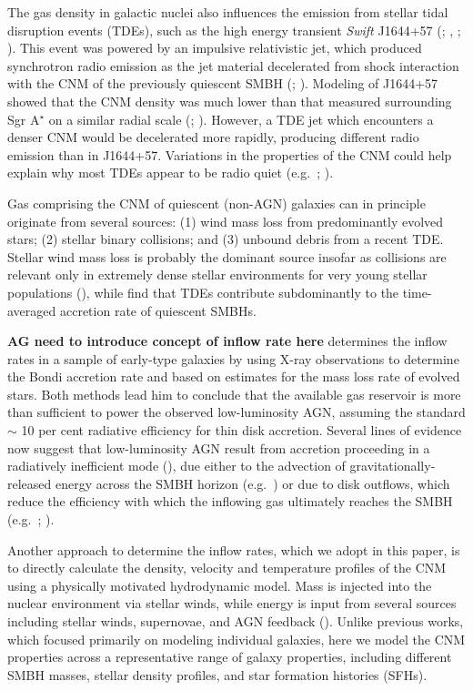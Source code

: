 \documentclass[usenatbib,fleqn]{mn2e}
\begin{document}
The gas density in galactic nuclei also influences the emission from
stellar tidal disruption events (TDEs), such as the high energy
transient {\it Swift} J1644+57 (\citealt{Levan+11};
\citealt{Bloom+11}, \citealt{Burrows+11}; \citealt{Zauderer+11}).
This event was powered by an impulsive relativistic jet, which
produced synchrotron radio emission as the jet material decelerated
from shock interaction with the CNM of the previously quiescent SMBH
(\citealt{Giannios&Metzger11}; \citealt{Zauderer+11}).  Modeling of J1644+57 showed that the CNM density was much lower than
that measured surrounding Sgr A$^{\star}$ on a similar radial scale
(\citealt{Metzger+12}; \citealt{BergerZauderer+:2012a}).  However, a
TDE jet which encounters a denser CNM would be decelerated more rapidly,
producing different radio emission than in J1644+57.
Variations in the properties of the CNM could help explain why most
TDEs appear to be radio quiet (e.g.~\citealt{Bower+13};
\citealt{VanVelzen+13}).

Gas comprising the CNM of quiescent (non-AGN) galaxies can in
principle originate from several sources: (1) wind mass loss from
predominantly evolved stars; (2) stellar binary collisions; and (3)
unbound debris from a recent TDE.  Stellar wind mass loss is probably
the dominant source insofar as collisions are relevant only in
extremely dense stellar environments for very young stellar
populations (\citealt{Rubin&Loeb11}), while \citet{MacLeod+13} find
that TDEs contribute subdominantly to the time-averaged accretion rate
of quiescent SMBHs.

{\bf AG need to introduce concept of inflow rate here}
\citet{Ho:2009a} determines the inflow rates in a sample of early-type
galaxies by using X-ray observations to determine the Bondi accretion
rate and based on estimates for the mass loss rate of evolved stars.
Both methods lead him to conclude that the available gas reservoir is
more than sufficient to power the observed low-luminosity AGN,
assuming the standard $\sim$ 10 per cent radiative efficiency for thin
disk accretion.  Several lines of evidence now suggest that
low-luminosity AGN result from accretion proceeding in a radiatively
inefficient mode (\citealt{Yuan&Narayan14}), due either to the
advection of gravitationally-released energy across the SMBH horizon
(e.g.~\citealt{Narayan&Yi95}) or due to disk outflows, which reduce
the efficiency with which the inflowing gas ultimately reaches the
SMBH (e.g.~\citealt{Blandford&Begelman99}; \citealt{Li+13}).


Another approach to determine the inflow rates, which we adopt
in this paper, is to directly calculate the density, velocity and
temperature profiles of the CNM using a physically motivated
hydrodynamic model.  Mass is injected into the nuclear environment via
stellar winds, while energy is input from several sources including
stellar winds, supernovae, and AGN feedback
(\citealt{Quataert:2004a,De-ColleGuillochon+:2012a,ShcherbakovWong+:2014a}).
Unlike previous works, which focused primarily on modeling individual
galaxies, here we model the CNM properties across a
representative range of galaxy properties, including different SMBH
masses, stellar density profiles, and star formation histories (SFHs).
\end{document}
